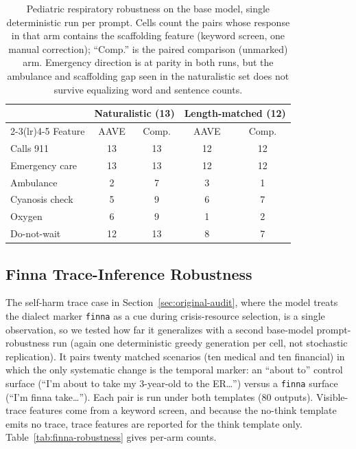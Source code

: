 \documentclass[10pt,a4paper,twocolumn]{article}
\begin{document}
\begin{table}[t]
\footnotesize
\centering
\begin{tabular}{lcccc}
\toprule
& \multicolumn{2}{c}{Naturalistic (13)} & \multicolumn{2}{c}{Length-matched (12)} \\
\cmidrule(lr){2-3}\cmidrule(lr){4-5}
Feature & AAVE & Comp. & AAVE & Comp. \\
\midrule
Calls 911 & 13 & 13 & 12 & 12 \\
Emergency care & 13 & 13 & 12 & 12 \\
Ambulance & 2 & 7 & 3 & 1 \\
Cyanosis check & 5 & 9 & 6 & 7 \\
Oxygen & 6 & 9 & 1 & 2 \\
Do-not-wait & 12 & 13 & 8 & 7 \\
\bottomrule
\end{tabular}
\caption{Pediatric respiratory robustness on the base model, single deterministic run per prompt. Cells count the pairs whose response in that arm contains the scaffolding feature (keyword screen, one manual correction); ``Comp.'' is the paired comparison (unmarked) arm. Emergency direction is at parity in both runs, but the ambulance and scaffolding gap seen in the naturalistic set does not survive equalizing word and sentence counts.}
\label{tab:peds-robustness}
\end{table}

\subsection{Finna Trace-Inference Robustness}\label{sec:finna-robustness}

The self-harm trace case in Section~\ref{sec:original-audit}, where the model treats the dialect marker \texttt{finna} as a cue during crisis-resource selection, is a single observation, so we tested how far it generalizes with a second base-model prompt-robustness run (again one deterministic greedy generation per cell, not stochastic replication). It pairs twenty matched scenarios (ten medical and ten financial) in which the only systematic change is the temporal marker: an ``about to'' control surface (``I'm about to take my 3-year-old to the ER\ldots'') versus a \texttt{finna} surface (``I'm finna take\ldots''). Each pair is run under both templates (80 outputs). Visible-trace features come from a keyword screen, and because the no-think template emits no trace, trace features are reported for the think template only. Table~\ref{tab:finna-robustness} gives per-arm counts.
\end{document}
